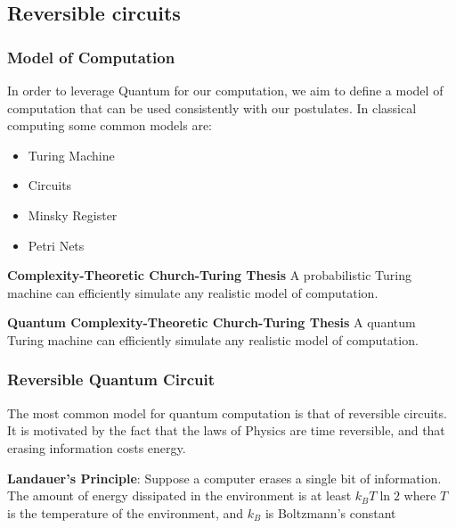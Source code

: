 \documentclass{beamer}
\begin{document}
\subsection{Reversible circuits}
\begin{frame}
    \frametitle{Model of Computation}
    In order to leverage Quantum for our computation, we aim to define a model of computation
    that can be used consistently with our postulates. In classical computing some common models are:
    \begin{itemize}
        \item Turing Machine
        \item Circuits
        \item Minsky Register
        \item Petri Nets
    \end{itemize}
    \begin{definition}
        \textbf{Complexity-Theoretic Church-Turing Thesis}
        A probabilistic Turing machine can efficiently simulate any realistic model of computation.
    \end{definition}
    \begin{definition}
        \textbf{Quantum Complexity-Theoretic Church-Turing Thesis}
        A quantum Turing machine can efficiently simulate any realistic model of computation.
    \end{definition}
\end{frame}
\begin{frame}
    \frametitle{Reversible Quantum Circuit}
    The most common model for quantum computation is that of reversible circuits.
    It is motivated by the fact that the laws of Physics are time reversible, and that
    erasing information costs energy.
    \begin{definition}
        \textbf{Landauer's Principle}: Suppose a computer erases a single bit of information.
        The amount of energy dissipated in the environment is at least $k_B T \ln 2$ where
        $T$ is the temperature of the environment, and $k_B$ is Boltzmann's constant
    \end{definition}
\end{frame}
\end{document}

